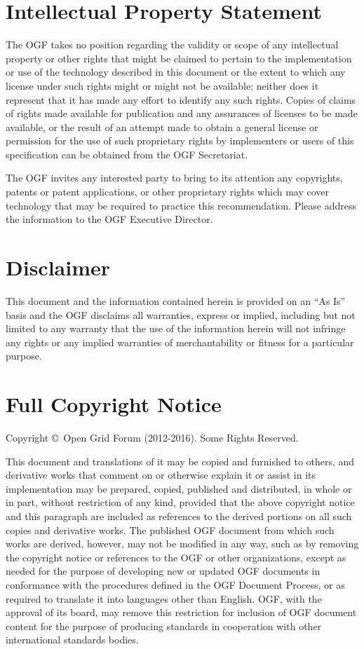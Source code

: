 \documentclass{article}
\newcommand{\copyrightyears}{2012-2016}
\begin{document}
\section{Intellectual Property Statement}

 The OGF takes no position regarding the validity or scope of any
 intellectual property or other rights that might be claimed to
 pertain to the implementation or use of the technology described in
 this document or the extent to which any license under such rights
 might or might not be available; neither does it represent that it
 has made any effort to identify any such rights.  Copies of claims of
 rights made available for publication and any assurances of licenses
 to be made available, or the result of an attempt made to obtain a
 general license or permission for the use of such proprietary rights
 by implementers or users of this specification can be obtained from
 the OGF Secretariat.

 The OGF invites any interested party to bring to its attention any
 copyrights, patents or patent applications, or other proprietary
 rights which may cover technology that may be required to practice
 this recommendation.  Please address the information to the OGF
 Executive Director.


\section{Disclaimer}

 This document and the information contained herein is provided on an
 ``As Is'' basis and the OGF disclaims all warranties, express or
 implied, including but not limited to any warranty that the use of
 the information herein will not infringe any rights or any implied
 warranties of merchantability or fitness for a particular purpose.


\section{Full Copyright Notice}

 Copyright \copyright \ Open Grid Forum (\copyrightyears). Some Rights
 Reserved.

 This document and translations of it may be copied and furnished to
 others, and derivative works that comment on or otherwise explain it
 or assist in its implementation may be prepared, copied, published
 and distributed, in whole or in part, without restriction of any
 kind, provided that the above copyright notice and this paragraph are
 included as references to the derived portions on all such copies and
 derivative works. The published OGF document from which such works
 are derived, however, may not be modified in any way, such as by
 removing the copyright notice or references to the OGF or other
 organizations, except as needed for the purpose of developing new or
 updated OGF documents in conformance with the procedures defined in
 the OGF Document Process, or as required to translate it into
 languages other than English. OGF, with the approval of its board,
 may remove this restriction for inclusion of OGF document content for
 the purpose of producing standards in cooperation with other
 international standards bodies.
\end{document}
